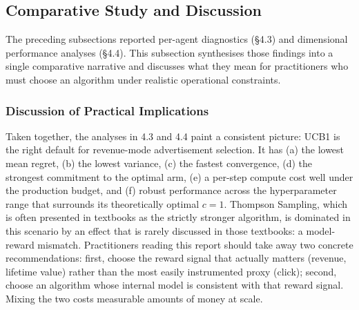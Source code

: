 \subsection{Comparative Study and Discussion}
The preceding subsections reported per-agent diagnostics (\S4.3) and dimensional performance analyses (\S4.4). This subsection synthesises those findings into a single comparative narrative and discusses what they mean for practitioners who must choose an algorithm under realistic operational constraints.

\subsubsection{Discussion of Practical Implications}
Taken together, the analyses in 4.3 and 4.4 paint a consistent picture: UCB1 is the right default for revenue-mode advertisement selection. It has (a) the lowest mean regret, (b) the lowest variance, (c) the fastest convergence, (d) the strongest commitment to the optimal arm, (e) a per-step compute cost well under the production budget, and (f) robust performance across the hyperparameter range that surrounds its theoretically optimal $c = 1$. Thompson Sampling, which is often presented in textbooks as the strictly stronger algorithm, is dominated in this scenario by an effect that is rarely discussed in those textbooks: a model-reward mismatch. Practitioners reading this report should take away two concrete recommendations: first, choose the reward signal that actually matters (revenue, lifetime value) rather than the most easily instrumented proxy (click); second, choose an algorithm whose internal model is consistent with that reward signal. Mixing the two costs measurable amounts of money at scale.

\newpage

